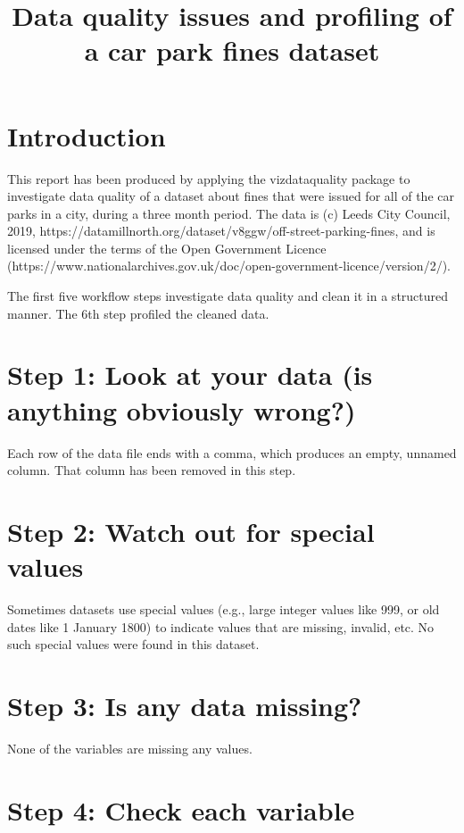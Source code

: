 \documentclass{article}
\title{Data quality issues and profiling of a car park fines dataset}
\begin{document}
\maketitle

\section{Introduction}

This report has been produced by applying the vizdataquality package to investigate data quality of a dataset about fines that were issued for all of the car parks in a city, during a three month period. The data is (c) Leeds City Council, 2019, https://datamillnorth.org/dataset/v8ggw/off-street-parking-fines, and is licensed under the terms of the Open Government Licence (https://www.nationalarchives.gov.uk/doc/open-government-licence/version/2/).

The first five workflow steps investigate data quality and clean it in a structured manner. The 6th step profiled the cleaned data.

\section{Step 1: Look at your data (is anything obviously wrong?)}

Each row of the data file ends with a comma, which produces an empty, unnamed column. That column has been removed in this step.

\section{Step 2: Watch out for special values}

Sometimes datasets use special values (e.g., large integer values like 999, or old dates like 1 January 1800) to indicate values that are missing, invalid, etc. No such special values were found in this dataset.

\section{Step 3: Is any data missing?}

None of the variables are missing any values.

\section{Step 4: Check each variable}
\end{document}
